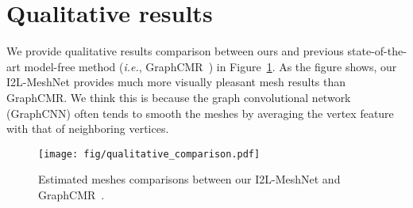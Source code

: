\documentclass[runningheads]{llncs}
\begin{document}
\section{Qualitative results}
We provide qualitative results comparison between ours and previous state-of-the-art model-free method (\textit{i.e.}, GraphCMR~\cite{kolotouros2019convolutional}) in Figure~\ref{fig:qualitative}.
As the figure shows, our I2L-MeshNet provides much more visually pleasant mesh results than GraphCMR.
We think this is because the graph convolutional network (GraphCNN) often tends to smooth the meshes by averaging the vertex feature with that of neighboring vertices.


\begin{figure}
\begin{center}
\texttt{[image: fig/qualitative\_comparison.pdf]}
\end{center}
\vspace*{-7mm}
   \caption{
    Estimated meshes comparisons between our I2L-MeshNet and GraphCMR~\cite{kolotouros2019convolutional}.
   }
\vspace*{-8mm}
\label{fig:qualitative}
\end{figure}


\clearpage
 


\end{document}
